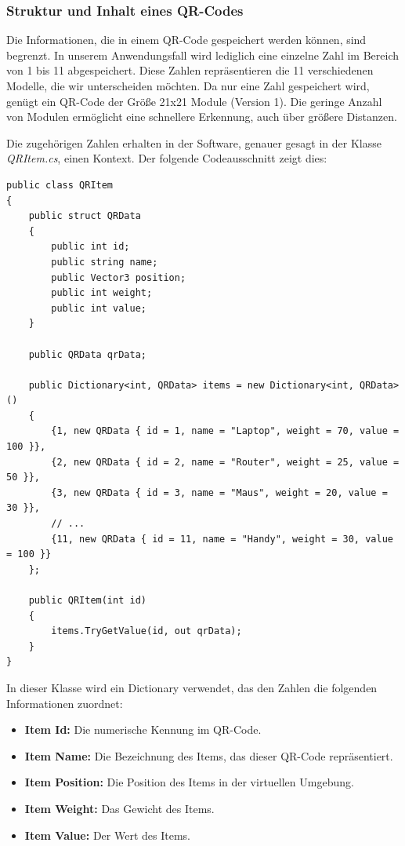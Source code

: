 \subsubsection{Struktur und Inhalt eines QR-Codes}
Die Informationen, die in einem QR-Code gespeichert werden können, sind begrenzt. In unserem Anwendungsfall wird lediglich
eine einzelne Zahl im Bereich von 1 bis 11 abgespeichert. Diese Zahlen repräsentieren die 11 verschiedenen Modelle, die
wir unterscheiden möchten. Da nur eine Zahl gespeichert wird, genügt ein QR-Code der Größe 21x21 Module (Version 1). Die
geringe Anzahl von Modulen ermöglicht eine schnellere Erkennung, auch über größere Distanzen.

Die zugehörigen Zahlen erhalten in der Software, genauer gesagt in der Klasse \textit{QRItem.cs}, einen Kontext. Der folgende Codeausschnitt zeigt dies:

\begin{lstlisting}[style=csharp, caption={}, label=code:update]
public class QRItem
{
    public struct QRData
    {
        public int id;
        public string name;
        public Vector3 position;
        public int weight;
        public int value;
    }

    public QRData qrData;

    public Dictionary<int, QRData> items = new Dictionary<int, QRData>()
    {
        {1, new QRData { id = 1, name = "Laptop", weight = 70, value = 100 }},
        {2, new QRData { id = 2, name = "Router", weight = 25, value = 50 }},
        {3, new QRData { id = 3, name = "Maus", weight = 20, value = 30 }},
        // ...
        {11, new QRData { id = 11, name = "Handy", weight = 30, value = 100 }}
    };

    public QRItem(int id)
    {
        items.TryGetValue(id, out qrData);
    }
}
\end{lstlisting}

In dieser Klasse wird ein Dictionary verwendet, das den Zahlen die folgenden Informationen zuordnet:

\begin{itemize}
    \item \textbf{Item Id:} Die numerische Kennung im QR-Code.
    \item \textbf{Item Name:} Die Bezeichnung des Items, das dieser QR-Code repräsentiert.
    \item \textbf{Item Position:} Die Position des Items in der virtuellen Umgebung.
    \item \textbf{Item Weight:} Das Gewicht des Items.
    \item \textbf{Item Value:} Der Wert des Items.
\end{itemize}

